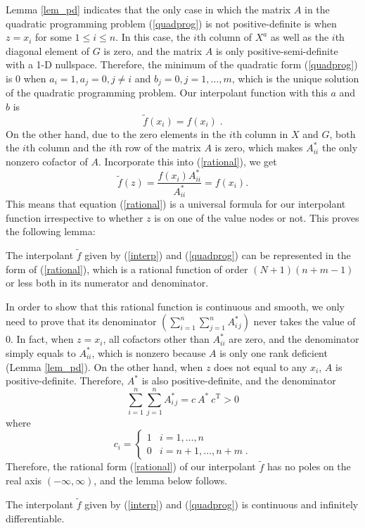 Lemma \ref{lem_pd} indicates that the only case in which the matrix $A$ in
the quadratic programming problem (\ref{quadprog}) is not positive-definite
is when $z=x_i$ for some $1\le i\le n$.  In this case, the $i$th column of
$X^a$ as well as the $i$th diagonal element of $G$ is zero, and the matrix $A$
is only positive-semi-definite with a 1-D nullspace.  Therefore,
the minimum of the quadratic form (\ref{quadprog}) is 0 when $a_i = 1, a_j = 0,
j\ne i$ and $b_j = 0, j=1,\ldots,m$, which is the unique solution of the
quadratic programming problem.  Our interpolant function with this $a$ and $b$
is
\[ {\tilde f}(x_i) = f(x_i) \;.\]
On the other hand, due to the zero elements
in the $i$th column in $X$ and $G$, both the $i$th column and the $i$th row
of the matrix $A$ is zero, which makes $A^*_{ii}$ the only nonzero cofactor
of $A$.  Incorporate this into (\ref{rational}), we get
\[ {\tilde f}(z) = \frac{f(x_i) A^*_{ii}}{A^*_{ii}} = f(x_i) . \]
This means that equation (\ref{rational}) is a universal formula for our
interpolant function irrespective to whether $z$ is on one of the value
nodes or not.  This proves the following lemma:
\begin{proposition} \label{prop_rational}
The interpolant $\tilde f$ given by (\ref{interp}) and
(\ref{quadprog}) can be represented in the form of (\ref{rational}), which
is a rational function of order $(N+1)(n+m-1)$ or less both in its numerator
and denominator.
\end{proposition}

In order to show that this rational function is continuous and smooth,
we only need to prove that its denominator 
$\left(\sum_{i=1}^n\sum_{j=1}^n A^*_{i\,j}\right)$ never takes the value of
0.  In fact, when $z=x_i$, all cofactors other than $A^*_{ii}$ are zero, and
the denominator simply equals to $A^*_{ii}$, which is nonzero because $A$
is only one rank deficient (Lemma \ref{lem_pd}).  On the other hand, when $z$
does not equal to any $x_i$, $A$ is positive-definite.
Therefore, $A^*$ is also positive-definite, and the denominator
\[ \sum_{i=1}^n\sum_{j=1}^n A^*_{i\,j} = c\: A^*\: c^{\mathrm T} > 0 \]
where
\[ c_i = \begin{cases} 1 & i=1,\ldots,n\\ 0 & i=n+1,\ldots,n+m \;. \end{cases}\]
Therefore, the rational form (\ref{rational}) of our interpolant $\tilde f$
has no poles on the real axis $(-\infty, \infty)$, and the lemma below
follows.
\begin{proposition} \label{prop_smooth}
The interpolant $\tilde f$ given by (\ref{interp}) and
(\ref{quadprog}) is continuous and infinitely differentiable.
\end{proposition}

